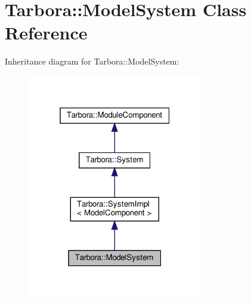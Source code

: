 \hypertarget{classTarbora_1_1ModelSystem}{}\section{Tarbora\+:\+:Model\+System Class Reference}
\label{classTarbora_1_1ModelSystem}


Inheritance diagram for Tarbora\+:\+:Model\+System\+:\nopagebreak
\begin{figure}[H]
\begin{center}
\leavevmode
\includegraphics[width=217pt]{classTarbora_1_1ModelSystem__inherit__graph}
\end{center}
\end{figure}


